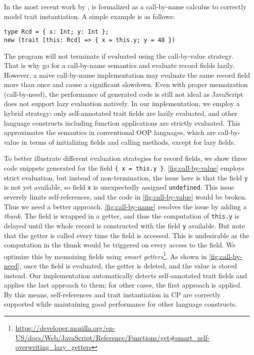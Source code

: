 \noindent
In the most recent work by \citet{fan2022direct}, \fiplus is formalized as a
call-by-name calculus to correctly model trait instantiation. A simple example
is as follows:
\begin{lstlisting}
type Rcd = { x: Int; y: Int };
new (trait [this: Rcd] => { x = this.y; y = 48 })
\end{lstlisting}
The program will not terminate if evaluated using the call-by-value strategy.
That is why \citeauthor{fan2022direct} go for a call-by-name semantics and
evaluate record fields lazily. However, a naive call-by-name implementation may
evaluate the same record field more than once and cause a significant slowdown.
Even with proper memoization (call-by-need), the performance of generated code
is still not ideal as JavaScript does not support lazy evaluation natively. In
our implementation, we employ a hybrid strategy: only self-annotated trait
fields are lazily evaluated, and other language constructs including function
applications are strictly evaluated. This approximates the semantics in
conventional OOP languages, which are call-by-value in terms of initializing
fields and calling methods, except for lazy fields.

To better illustrate different evaluation strategies for record fields, we show
three code snippets generated for the field \lstinline|{ x = this.y }|.
\autoref{fig:call-by-value} employs strict evaluation, but instead of
non-termination, the issue here is that the field \lstinline{y} is not yet
available, so field \lstinline{x} is unexpectedly assigned
\lstinline{undefined}. This issue severely limits self-references, and the code
in \autoref{fig:call-by-value} would be broken. Thus we need a better approach.
\autoref{fig:call-by-name} resolves the issue by adding a \emph{thunk}. The
field is wrapped in a getter, and thus the computation of \lstinline{this.y} is
delayed until the whole record is constructed with the field \lstinline{y}
available. But note that the getter is called every time the field is accessed.
This is undesirable as the computation in the thunk would be triggered on every
access to the field. We optimize this by memoizing fields using \emph{smart
getters}\footnote{\url{https://developer.mozilla.org/en-US/docs/Web/JavaScript/Reference/Functions/get\#smart_self-overwriting_lazy_getters}}.
As shown in \autoref{fig:call-by-need}, once the field is evaluated, the getter
is deleted, and the value is stored instead. Our implementation automatically
detects self-annotated trait fields and applies the last approach to them; for
other cases, the first approach is applied. By this means, self-references and
trait instantiation in CP are correctly supported while maintaining good
performance for other language constructs.

